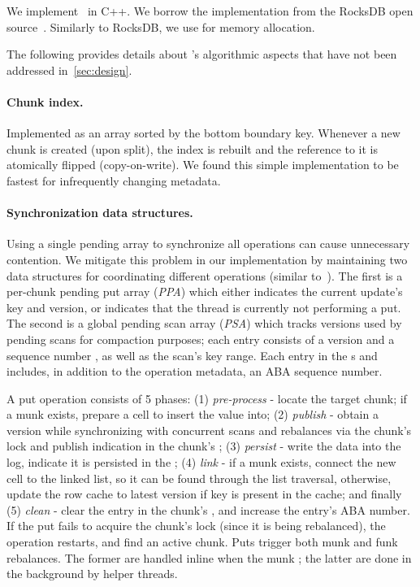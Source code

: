 We implement \sys\ in C++. We borrow the  implementation from the RocksDB open source~\cite{RocksDB}.
Similarly to RocksDB, we use  for memory allocation.  

The following provides details about \sys's algorithmic aspects that have not been addressed in~\cref{sec:design}.

\paragraph{Chunk index.}  Implemented as an array sorted by the bottom boundary key. 
Whenever a new chunk is created (upon split), the index is rebuilt and the reference to it is atomically flipped
(copy-on-write). We found this simple implementation to be fastest for infrequently changing metadata. 

\paragraph{Synchronization data structures.}
Using a single pending array to synchronize all
operations can cause unnecessary contention.
We mitigate this problem in our implementation by maintaining two data structures for coordinating different operations (similar to~\cite{kiwi}). The first is a per-chunk pending put array (\emph{PPA}) which 
either indicates the current update's key and version, or indicates that the thread is currently not performing a put.
The second is a global pending scan array (\emph{PSA}) which tracks versions used by pending scans for compaction purposes; each entry consists of a version  and a sequence number , as well as the scan’s key range. Each entry in the s and  includes, in addition to the operation metadata, an ABA sequence number. 

A put operation consists of 5 phases: (1) \emph{pre-process} - locate the target chunk; if a munk exists, prepare a cell to insert the value into; (2) \emph{publish} - obtain a version while synchronizing with concurrent scans and rebalances via the chunk's lock and publish indication in the chunk's ; (3) \emph{persist} - write the data into the log, indicate it is persisted in the ; (4) \emph{link} - if a munk exists, connect the new cell to the linked list, so it can be found through the list traversal, otherwise, update the row cache to latest version if key is present in the cache; and finally (5) \emph{clean} - clear the entry in the chunk's , and increase the entry's ABA number.
If the put fails to acquire the chunk's lock (since it is being rebalanced), the operation restarts, and {} find an active chunk.
Puts trigger both munk and funk rebalances. The former are handled inline when the munk {}; the latter are done in the background 
by helper threads.

